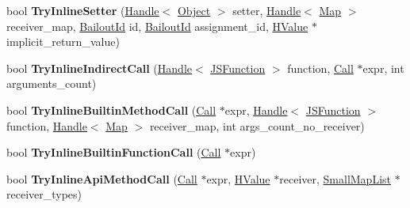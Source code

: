 \begin{DoxyCompactItemize}
\item 
bool {\bfseries Try\+Inline\+Setter} (\hyperlink{classv8_1_1internal_1_1_handle}{Handle}$<$ \hyperlink{classv8_1_1internal_1_1_object}{Object} $>$ setter, \hyperlink{classv8_1_1internal_1_1_handle}{Handle}$<$ \hyperlink{classv8_1_1internal_1_1_map}{Map} $>$ receiver\+\_\+map, \hyperlink{classv8_1_1internal_1_1_bailout_id}{Bailout\+Id} id, \hyperlink{classv8_1_1internal_1_1_bailout_id}{Bailout\+Id} assignment\+\_\+id, \hyperlink{classv8_1_1internal_1_1_h_value}{H\+Value} $\ast$implicit\+\_\+return\+\_\+value)\hypertarget{classv8_1_1internal_1_1_h_optimized_graph_builder_a344fa932a5edb0e40432805f0e6b8d6c}{}\label{classv8_1_1internal_1_1_h_optimized_graph_builder_a344fa932a5edb0e40432805f0e6b8d6c}

\item 
bool {\bfseries Try\+Inline\+Indirect\+Call} (\hyperlink{classv8_1_1internal_1_1_handle}{Handle}$<$ \hyperlink{classv8_1_1internal_1_1_j_s_function}{J\+S\+Function} $>$ function, \hyperlink{classv8_1_1internal_1_1_call}{Call} $\ast$expr, int arguments\+\_\+count)\hypertarget{classv8_1_1internal_1_1_h_optimized_graph_builder_a44eff64503a8a3ba523d18d8f9face7c}{}\label{classv8_1_1internal_1_1_h_optimized_graph_builder_a44eff64503a8a3ba523d18d8f9face7c}

\item 
bool {\bfseries Try\+Inline\+Builtin\+Method\+Call} (\hyperlink{classv8_1_1internal_1_1_call}{Call} $\ast$expr, \hyperlink{classv8_1_1internal_1_1_handle}{Handle}$<$ \hyperlink{classv8_1_1internal_1_1_j_s_function}{J\+S\+Function} $>$ function, \hyperlink{classv8_1_1internal_1_1_handle}{Handle}$<$ \hyperlink{classv8_1_1internal_1_1_map}{Map} $>$ receiver\+\_\+map, int args\+\_\+count\+\_\+no\+\_\+receiver)\hypertarget{classv8_1_1internal_1_1_h_optimized_graph_builder_aac7898d6266d15a3810f240c8dfa8396}{}\label{classv8_1_1internal_1_1_h_optimized_graph_builder_aac7898d6266d15a3810f240c8dfa8396}

\item 
bool {\bfseries Try\+Inline\+Builtin\+Function\+Call} (\hyperlink{classv8_1_1internal_1_1_call}{Call} $\ast$expr)\hypertarget{classv8_1_1internal_1_1_h_optimized_graph_builder_ad436c116c5688a3ccce50130be7ff182}{}\label{classv8_1_1internal_1_1_h_optimized_graph_builder_ad436c116c5688a3ccce50130be7ff182}

\item 
bool {\bfseries Try\+Inline\+Api\+Method\+Call} (\hyperlink{classv8_1_1internal_1_1_call}{Call} $\ast$expr, \hyperlink{classv8_1_1internal_1_1_h_value}{H\+Value} $\ast$receiver, \hyperlink{classv8_1_1internal_1_1_small_map_list}{Small\+Map\+List} $\ast$receiver\+\_\+types)\hypertarget{classv8_1_1internal_1_1_h_optimized_graph_builder_a0db40d3c8c7d61fb4c2951a138d34039}{}\label{classv8_1_1internal_1_1_h_optimized_graph_builder_a0db40d3c8c7d61fb4c2951a138d34039}


\end{DoxyCompactItemize}
